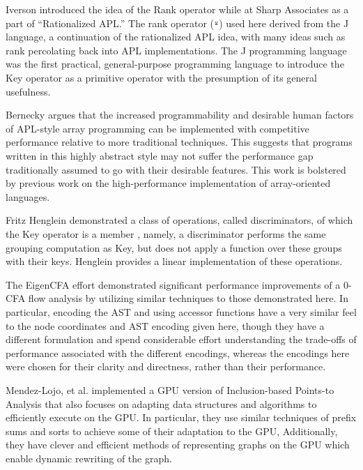 ﻿\documentclass[numbers,10pt,preprint]{sigplanconf}
\begin{document}
Iverson introduced the idea of the Rank operator while at Sharp Associates \cite{iverson1983rationalized} as a part of ``Rationalized APL.'' The rank operator (\verb;⍤;) used here derived from the J language, a continuation of the rationalized APL idea, with many ideas such as rank percolating back into APL implementations. \cite{bernecky1987rank,hui1995rank} The J programming language \cite{hui2014key} was the first practical, general-purpose programming language to introduce the Key operator as a primitive operator with the presumption of its general usefulness.

Bernecky \cite{bernecky2015abstract} argues that the increased programmability and desirable human factors of APL-style array programming can be implemented with competitive performance relative to more traditional techniques. This suggests that programs written in this highly abstract style may not suffer the performance gap traditionally assumed to go with their desirable features. This work is bolstered by previous work on the high-performance implementation of array-oriented languages. \cite{ching1994experimental,ching1993primitive, ching1990automatic,ju1991exploitation, ju1991performance,bernecky1999reducing,schwarz1991acorn}

Fritz Henglein demonstrated a class of operations, called discriminators, of which the Key operator is a member \cite{henglein2013dd} , namely, a discriminator performs the same grouping computation as Key, but does not apply a function over these groups with their keys. Henglein provides a linear implementation of these operations.

The EigenCFA effort \cite{prabhu2011eigencfa} demonstrated significant performance improvements of a 0-CFA flow analysis by utilizing similar techniques to those demonstrated here. In particular, encoding the AST and using accessor functions have a very similar feel to the node coordinates and AST encoding given here, though they have a different formulation and spend considerable effort understanding the trade-offs of performance associated with the different encodings, whereas the encodings here were chosen for their clarity and directness, rather than their performance.

Mendez-Lojo, et al. implemented a GPU version of Inclusion-based Points-to Analysis \cite{mendez2012inclusion} that also focuses on adapting data structures and algorithms to efficiently execute on the GPU. In particular, they use similar techniques of prefix sums and sorts to achieve some of their adaptation to the GPU, Additionally, they have clever and efficient methods of representing graphs on the GPU which enable dynamic rewriting of the graph.
\end{document}
